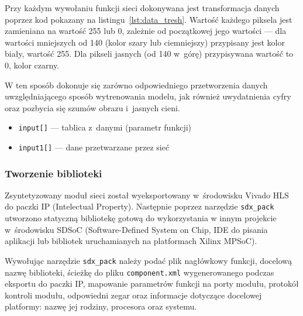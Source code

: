 \documentclass[12pt, oneside, a4paper]{article}
\begin{document}
Przy każdym wywołaniu funkcji sieci dokonywana jest transformacja
danych poprzez kod pokazany na listingu~\ref{lst:data_tresh}.
Wartość każdego piksela jest zamieniana na wartość 255 lub 0, zależnie
od początkowej jego wartości --- dla wartości mniejszych od 140
(kolor szary lub ciemniejszy) przypisany jest kolor biały, wartość 255.
Dla pikseli jasnych (od 140 w~górę) przypisywana wartość to 0, kolor czarny.

W ten sposób dokonuje się zarówno odpowiedniego przetworzenia danych
uwzględniającego sposób wytrenowania modelu, jak również uwydatnienia
cyfry oraz pozbycia się szumów obrazu i~jasnych cieni.

\hspace{-1cm}
\begin{minipage}{\linewidth}

\begin{itemize}
  \setlength{\itemindent}{3em}
  \item \lstinline[style=hls]{input[]} --- tablica z~danymi (parametr funkcji)
  \item \lstinline[style=hls]{input1[]} --- dane przetwarzane przez sieć
\end{itemize}
\end{minipage}

\subsubsection{Tworzenie biblioteki}\label{section:create_library}

Zsyntetyzowany moduł sieci został wyeksportowany w~środowisku Vivado HLS
do paczki IP (Intelectual Property). Następnie poprzez narzędzie
\lstinline{sdx_pack} utworzono statyczną bibliotekę gotową do wykorzystania
w innym projekcie w~środowisku SDSoC (Software-Defined System on Chip,
IDE do pisania aplikacji lub bibliotek uruchamianych na platformach
Xilinx MPSoC).

Wywołując narzędzie \lstinline{sdx_pack} należy podać plik nagłówkowy funkcji,
docelową nazwę biblioteki,
ścieżkę do pliku \lstinline{component.xml} wygenerowanego podczas eksportu
do paczki IP, mapowanie parametrów funkcji na porty modułu,
protokół kontroli modułu, odpowiedni zegar oraz informacje
dotyczące docelowej platformy: nazwę jej rodziny, procesora oraz systemu.

\hspace{1mm}
\begin{minipage}{0.95\linewidth}

\end{minipage}
\end{document}
